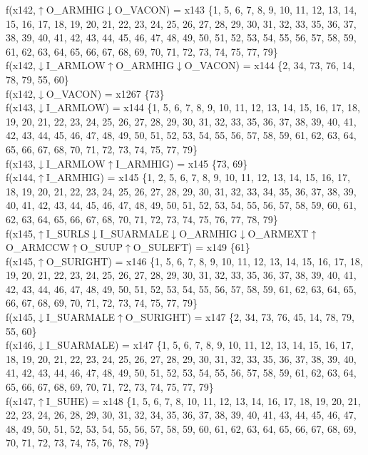 f(x142,$\uparrow$O\_ARMHIG$\downarrow$O\_VACON) = x143 \{1, 5, 6, 7, 8, 9, 10, 11, 12, 13, 14, 15, 16, 17, 18, 19, 20, 21, 22, 23, 24, 25, 26, 27, 28, 29, 30, 31, 32, 33, 35, 36, 37, 38, 39, 40, 41, 42, 43, 44, 45, 46, 47, 48, 49, 50, 51, 52, 53, 54, 55, 56, 57, 58, 59, 61, 62, 63, 64, 65, 66, 67, 68, 69, 70, 71, 72, 73, 74, 75, 77, 79\} \\  
f(x142,$\downarrow$I\_ARMLOW$\uparrow$O\_ARMHIG$\downarrow$O\_VACON) = x144 \{2, 34, 73, 76, 14, 78, 79, 55, 60\} \\  
f(x142,$\downarrow$O\_VACON) = x1267 \{73\} \\  
f(x143,$\downarrow$I\_ARMLOW) = x144 \{1, 5, 6, 7, 8, 9, 10, 11, 12, 13, 14, 15, 16, 17, 18, 19, 20, 21, 22, 23, 24, 25, 26, 27, 28, 29, 30, 31, 32, 33, 35, 36, 37, 38, 39, 40, 41, 42, 43, 44, 45, 46, 47, 48, 49, 50, 51, 52, 53, 54, 55, 56, 57, 58, 59, 61, 62, 63, 64, 65, 66, 67, 68, 70, 71, 72, 73, 74, 75, 77, 79\} \\  
f(x143,$\downarrow$I\_ARMLOW$\uparrow$I\_ARMHIG) = x145 \{73, 69\} \\  
f(x144,$\uparrow$I\_ARMHIG) = x145 \{1, 2, 5, 6, 7, 8, 9, 10, 11, 12, 13, 14, 15, 16, 17, 18, 19, 20, 21, 22, 23, 24, 25, 26, 27, 28, 29, 30, 31, 32, 33, 34, 35, 36, 37, 38, 39, 40, 41, 42, 43, 44, 45, 46, 47, 48, 49, 50, 51, 52, 53, 54, 55, 56, 57, 58, 59, 60, 61, 62, 63, 64, 65, 66, 67, 68, 70, 71, 72, 73, 74, 75, 76, 77, 78, 79\} \\  
f(x145,$\uparrow$I\_SURLS$\downarrow$I\_SUARMALE$\downarrow$O\_ARMHIG$\downarrow$O\_ARMEXT$\uparrow$O\_ARMCCW$\uparrow$O\_SUUP$\uparrow$O\_SULEFT) = x149 \{61\} \\  
f(x145,$\uparrow$O\_SURIGHT) = x146 \{1, 5, 6, 7, 8, 9, 10, 11, 12, 13, 14, 15, 16, 17, 18, 19, 20, 21, 22, 23, 24, 25, 26, 27, 28, 29, 30, 31, 32, 33, 35, 36, 37, 38, 39, 40, 41, 42, 43, 44, 46, 47, 48, 49, 50, 51, 52, 53, 54, 55, 56, 57, 58, 59, 61, 62, 63, 64, 65, 66, 67, 68, 69, 70, 71, 72, 73, 74, 75, 77, 79\} \\  
f(x145,$\downarrow$I\_SUARMALE$\uparrow$O\_SURIGHT) = x147 \{2, 34, 73, 76, 45, 14, 78, 79, 55, 60\} \\  
f(x146,$\downarrow$I\_SUARMALE) = x147 \{1, 5, 6, 7, 8, 9, 10, 11, 12, 13, 14, 15, 16, 17, 18, 19, 20, 21, 22, 23, 24, 25, 26, 27, 28, 29, 30, 31, 32, 33, 35, 36, 37, 38, 39, 40, 41, 42, 43, 44, 46, 47, 48, 49, 50, 51, 52, 53, 54, 55, 56, 57, 58, 59, 61, 62, 63, 64, 65, 66, 67, 68, 69, 70, 71, 72, 73, 74, 75, 77, 79\} \\  
f(x147,$\uparrow$I\_SUHE) = x148 \{1, 5, 6, 7, 8, 10, 11, 12, 13, 14, 16, 17, 18, 19, 20, 21, 22, 23, 24, 26, 28, 29, 30, 31, 32, 34, 35, 36, 37, 38, 39, 40, 41, 43, 44, 45, 46, 47, 48, 49, 50, 51, 52, 53, 54, 55, 56, 57, 58, 59, 60, 61, 62, 63, 64, 65, 66, 67, 68, 69, 70, 71, 72, 73, 74, 75, 76, 78, 79\} \\  
